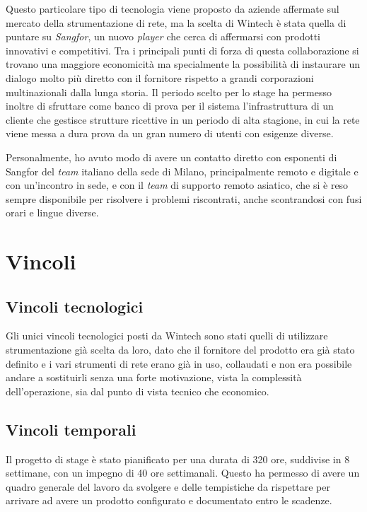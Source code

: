 Questo particolare tipo di tecnologia viene proposto da aziende affermate sul mercato della strumentazione di rete, ma la scelta di Wintech è stata quella di puntare su \emph{Sangfor}, un nuovo \emph{player} che cerca di affermarsi con prodotti innovativi e competitivi. Tra i principali punti di forza di questa collaborazione si trovano una maggiore economicità ma specialmente la possibilità di instaurare un dialogo molto più diretto con il fornitore rispetto a grandi corporazioni multinazionali dalla lunga storia. Il periodo scelto per lo stage ha permesso inoltre di sfruttare come banco di prova per il sistema l'infrastruttura di un cliente che gestisce strutture ricettive in un periodo di alta stagione, in cui la rete viene messa a dura prova da un gran numero di utenti con esigenze diverse.

Personalmente, ho avuto modo di avere un contatto diretto con esponenti di Sangfor del \emph{team} italiano della sede di Milano, principalmente remoto e digitale e con un'incontro in sede, e con il \emph{team} di supporto remoto asiatico, che si è reso sempre disponibile per risolvere i problemi riscontrati, anche scontrandosi con fusi orari e lingue diverse.

\section{Vincoli}

\subsection{Vincoli tecnologici}

Gli unici vincoli tecnologici posti da Wintech sono stati quelli di utilizzare strumentazione già scelta da loro, dato che il fornitore del prodotto era già stato definito e i vari strumenti di rete erano già in uso, collaudati e non era possibile andare a sostituirli senza una forte motivazione, vista la complessità dell'operazione, sia dal punto di vista tecnico che economico.

\subsection{Vincoli temporali}

Il progetto di stage è stato pianificato per una durata di 320 ore, suddivise in 8 settimane, con un impegno di 40 ore settimanali. Questo ha permesso di avere un quadro generale del lavoro da svolgere e delle tempistiche da rispettare per arrivare ad avere un prodotto configurato e documentato entro le scadenze.


